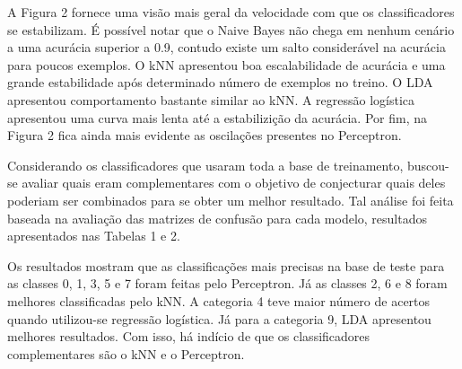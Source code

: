 \documentclass[
	12pt,				%
	openright,			%
	twoside,			%
	a4paper,			%
	english,			%
	brazil,				%
	svgnames
	]{abntex2}\usepackage[]{graphicx}\usepackage[]{color}
\begin{document}
A Figura 2 fornece uma visão mais geral da velocidade com que os classificadores se estabilizam. É possível notar que o Naive Bayes não chega em nenhum cenário a uma acurácia superior a 0.9, contudo existe um salto considerável na acurácia para poucos exemplos. O kNN apresentou boa escalabilidade de acurácia e uma grande estabilidade após determinado número de exemplos no treino. O LDA apresentou comportamento bastante similar ao kNN. A regressão logística apresentou uma curva mais lenta até a estabilizição da acurácia. Por fim, na Figura 2 fica ainda mais evidente as oscilações presentes no Perceptron.

Considerando os classificadores que usaram toda a base de treinamento, buscou-se avaliar quais eram complementares com o objetivo de conjecturar quais deles poderiam ser combinados para se obter um melhor resultado. Tal análise foi feita baseada na avaliação das matrizes de confusão para cada modelo, resultados apresentados nas Tabelas 1 e 2. 

Os resultados mostram que as classificações mais precisas na base de teste para as classes 0, 1, 3, 5 e 7 foram feitas pelo Perceptron. Já as classes 2, 6 e 8 foram melhores classificadas pelo kNN. A categoria 4 teve maior número de acertos quando utilizou-se regressão logística. Já para a categoria 9, LDA apresentou melhores resultados. Com isso, há indício de que os classificadores complementares são o kNN e o Perceptron.
\end{document}
